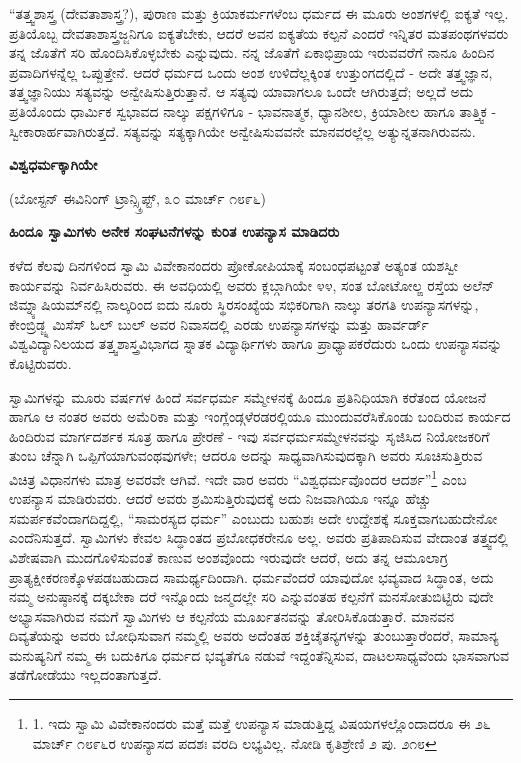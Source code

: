 “ತತ್ತ್ವಶಾಸ್ತ್ರ (ದೇವತಾಶಾಸ್ತ್ರ?), ಪುರಾಣ ಮತ್ತು ಕ್ರಿಯಾಕರ್ಮಗಳೆಂಬ ಧರ್ಮದ ಈ ಮೂರು ಅಂಶಗಳಲ್ಲಿ ಐಕ್ಯತೆ ಇಲ್ಲ. ಪ್ರತಿಯೊಬ್ಬ ದೇವತಾಶಾಸ್ತ್ರಜ್ಜನಿಗೂ ಐಕ್ಯತೆಬೇಕು, ಆದರೆ ಅವನ ಐಕ್ಯತೆಯ ಕಲ್ಪನೆ ಎಂದರೆ ಇನ್ನಿತರ ಮತಪಂಥಗಳವರು ತನ್ನ ಜೊತೆಗೆ ಸರಿ ಹೊಂದಿಸಿಕೊಳ್ಳಬೇಕು ಎನ್ನುವುದು. ನನ್ನ ಜೊತೆಗೆ ಏಕಾಭಿಪ್ರಾಯ ಇರುವವರೆಗೆ ನಾನೂ ಹಿಂದಿನ ಪ್ರವಾದಿಗಳನ್ನೆಲ್ಲ ಒಪ್ಪುತ್ತೇನೆ. ಆದರೆ ಧರ್ಮದ ಒಂದು ಅಂಶ ಉಳಿದೆಲ್ಲಕ್ಕಿಂತ ಉತ್ತುಂಗದಲ್ಲಿದೆ - ಅದೇ ತತ್ತ್ವಜ್ಞಾನ, ತತ್ತ್ವಜ್ಞಾನಿಯು ಸತ್ಯವನ್ನು ಅನ್ವೇಷಿಸುತ್ತಿರುತ್ತಾನೆ. ಆ ಸತ್ಯವು ಯಾವಾಗಲೂ ಒಂದೇ ಆಗಿರುತ್ತದೆ; ಅಲ್ಲದೆ ಅದು ಪ್ರತಿಯೊಂದು ಧಾರ್ಮಿಕ ಸ್ವಭಾವದ ನಾಲ್ಕು ಪಕ್ಷಗಳಿಗೂ - ಭಾವನಾತ್ಮಕ, ಧ್ಯಾನಶೀಲ, ಕ್ರಿಯಾಶೀಲ ಹಾಗೂ ತಾತ್ತ್ವಿಕ - ಸ್ವೀಕಾರಾರ್ಹವಾಗಿರುತ್ತದೆ. ಸತ್ಯವನ್ನು ಸತ್ಯಕ್ಕಾಗಿಯೇ ಅನ್ವೇಷಿಸುವವನೇ ಮಾನವರಲ್ಲೆಲ್ಲ ಅತ್ಯುನ್ನತನಾಗಿರುವನು.

\begin{center}
\textbf{ವಿಶ್ವಧರ್ಮಕ್ಕಾಗಿಯೇ}
\end{center}

\begin{center}
(ಬೋಸ್ಟನ್ ಈವಿನಿಂಗ್ ಟ್ರಾನ್ಸ್ಕ್ರಿಪ್ಟ್, ೩೦ ಮಾರ್ಚ್ ೧೮೯೬)
\end{center}

\textbf{ಹಿಂದೂ ಸ್ವಾಮಿಗಳು ಅನೇಕ ಸಂಘಟನೆಗಳನ್ನು ಕುರಿತ ಉಪನ್ಯಾಸ ಮಾಡಿದರು}

ಕಳೆದ ಕೆಲವು ದಿನಗಳಿಂದ ಸ್ವಾಮಿ ವಿವೇಕಾನಂದರು ಪ್ರೋಕೋಪಿಯಾಕ್ಕೆ ಸಂಬಂಧಪಟ್ಟಂತೆ ಅತ್ಯಂತ ಯಶಸ್ವೀ ಕಾರ್ಯವನ್ನು ನಿರ್ವಹಿಸಿರುವರು. ಈ ಅವಧಿಯಲ್ಲಿ ಅವರು ಕ್ಲಬ್ಗಾಗಿಯೇ ೪೪, ಸಂತ ಬೋಟೋಲ್ಙ ರಸ್ತೆಯ ಅಲೆನ್ ಜಿಮ್ನ್ಯಾಷಿಯಮ್​ನಲ್ಲಿ ನಾಲ್ಕರಿಂದ ಐದು ನೂರು ಸ್ಥಿರಸಂಖ್ಯೆಯ ಸಭಿಕರಿಗಾಗಿ ನಾಲ್ಕು ತರಗತಿ ಉಪನ್ಯಾಸಗಳನ್ನು, ಕೇಂಬ್ರಿಡ್ಜ್ನ ಮಿಸೆಸ್ ಓಲ್ ಬುಲ್ ಅವರ ನಿವಾಸದಲ್ಲಿ ಎರಡು ಉಪನ್ಯಾಸಗಳನ್ನು ಮತ್ತು ಹಾರ್ವರ್ಡ್ ವಿಶ್ವವಿದ್ಯಾನಿಲಯದ ತತ್ತ್ವಶಾಸ್ತ್ರವಿಭಾಗದ ಸ್ನಾತಕ ವಿದ್ಯಾರ್ಥಿಗಳು ಹಾಗೂ ಪ್ರಾಧ್ಯಾಪಕರೆದುರು ಒಂದು ಉಪನ್ಯಾಸವನ್ನು ಕೊಟ್ಟಿರುವರು.

ಸ್ವಾಮಿಗಳನ್ನು ಮೂರು ವರ್ಷಗಳ ಹಿಂದೆ ಸರ್ವಧರ್ಮ ಸಮ್ಮೇಳನಕ್ಕೆ ಹಿಂದೂ ಪ್ರತಿನಿಧಿಯಾಗಿ ಕರೆತಂದ ಯೋಜನೆ ಹಾಗೂ ಆ ನಂತರ ಅವರು ಅಮೆರಿಕಾ ಮತ್ತು ಇಂಗ್ಲೆಂಡ್ಗಳೆರಡರಲ್ಲಿಯೂ ಮುಂದುವರೆಸಿಕೊಂಡು ಬಂದಿರುವ ಕಾರ್ಯದ ಹಿಂದಿರುವ ಮಾರ್ಗದರ್ಶಕ ಸೂತ್ರ ಹಾಗೂ ಪ್ರೇರಣೆ - ಇವು ಸರ್ವಧರ್ಮಸಮ್ಮೇಳನವನ್ನು ಸೃಜಿಸಿದ ನಿಯೋಜಕರಿಗೆ ತುಂಬ ಚೆನ್ನಾಗಿ ಒಪ್ಪಿಗೆಯಾಗುವಂಥವುಗಳೇ; ಆದರೂ ಅದನ್ನು ಸಾಧ್ಯವಾಗಿಸುವುದಕ್ಕಾಗಿ ಅವರು ಸೂಚಿಸುತ್ತಿರುವ ವಿಚಿತ್ರ ವಿಧಾನಗಳು ಮಾತ್ರ ಅವರವೇ ಆಗಿವೆ. ಇದೇ ವಾರ ಅವರು “ವಿಶ್ವಧರ್ಮವೊಂದರ ಆದರ್ಶ”\footnote{1. ಇದು ಸ್ವಾಮಿ ವಿವೇಕಾನಂದರು ಮತ್ತೆ ಮತ್ತೆ ಉಪನ್ಯಾಸ ಮಾಡುತ್ತಿದ್ದ ವಿಷಯಗಳಲ್ಲೊಂದಾದರೂ ಈ ೨೬ ಮಾರ್ಚ್ ೧೮೯೬ರ ಉಪನ್ಯಾಸದ ಪದಶಃ ವರದಿ ಲಭ್ಯವಿಲ್ಲ. ನೋಡಿ ಕೃತಿಶ್ರೇಣಿ ೨ ಪು. ೨೧೮} ಎಂಬ ಉಪನ್ಯಾಸ ಮಾಡಿರುವರು. ಆದರೆ ಅವರು ಶ್ರಮಿಸುತ್ತಿರುವುದಕ್ಕೆ ಅದು ನಿಜವಾಗಿಯೂ ಇನ್ನೂ ಹೆಚ್ಚು ಸಮರ್ಪಕವೆಂದಾಗದಿದ್ದಲ್ಲಿ, “ಸಾಮರಸ್ಯದ ಧರ್ಮ” ಎಂಬುದು ಬಹುಶಃ ಅದೇ ಉದ್ದೇಶಕ್ಕೆ ಸೂಕ್ತವಾಗಬಹುದೇನೋ ಎಂದೆನಿಸುತ್ತದೆ. ಸ್ವಾಮಿಗಳು ಕೇವಲ ಸಿದ್ಧಾಂತದ ಪ್ರಬೋಧಕರೇನೂ ಅಲ್ಲ. ಅವರು ಪ್ರತಿಪಾದಿಸುವ ವೇದಾಂತ ತತ್ತ್ವದಲ್ಲಿ ವಿಶೇಷವಾಗಿ ಮುದಗೊಳಿಸುವಂತೆ ಕಾಣುವ ಅಂಶವೊಂದು ಇರುವುದೇ ಆದರೆ, ಅದು ತನ್ನ ಆಮೂಲಾಗ್ರ ಪ್ರಾತ್ಯಕ್ಷೀಕರಣಕ್ಕೊಳಪಡಬಹುದಾದ ಸಾಮರ್ಥ್ಯದಿಂದಾಗಿ. ಧರ್ಮವೆಂದರೆ ಯಾವುದೋ ಭವ್ಯವಾದ ಸಿದ್ಧಾಂತ, ಅದು ನಮ್ಮ ಅನುಷ್ಠಾನಕ್ಕೆ ದಕ್ಕಬೇಕಾ ದರೆ ಇನ್ನೊಂದು ಜನ್ಮದಲ್ಲೇ ಸರಿ ಎನ್ನುವಂತಹ ಕಲ್ಪನೆಗೆ ಮನಸೋತುಬಿಟ್ಟಿರು ವುದೇ ಅಭ್ಯಾಸವಾಗಿರುವ ನಮಗೆ ಸ್ವಾಮಿಗಳು ಆ ಕಲ್ಪನೆಯ ಮೂರ್ಖತನವನ್ನು ತೋರಿಸಿಕೊಡುತ್ತಾರೆ. ಮಾನವನ ದಿವ್ಯತೆಯನ್ನು ಅವರು ಬೋಧಿಸುವಾಗ ನಮ್ಮಲ್ಲಿ ಅವರು ಅದೆಂತಹ ಶಕ್ತಿಚೈತನ್ಯಗಳನ್ನು ತುಂಬುತ್ತಾರೆಂದರೆ, ಸಾಮಾನ್ಯ ಮನುಷ್ಯನಿಗೆ ನಮ್ಮ ಈ ಬದುಕಿಗೂ ಧರ್ಮದ ಭವ್ಯತೆಗೂ ನಡುವೆ ಇದ್ದಂತೆನ್ನಿಸುವ, ದಾಟಲಸಾಧ್ಯವೆಂದು ಭಾಸವಾಗುವ ತಡೆಗೋಡೆಯು ಇಲ್ಲದಂತಾಗುತ್ತದೆ.

